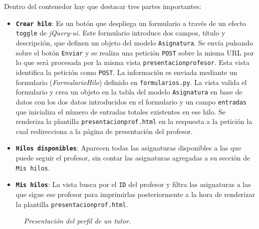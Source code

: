 \documentclass[a4paper, 12pt]{book}
\begin{document}
Dentro del contenedor hay que destacar tres partes importantes:
\begin{itemize}
  \item {\bfseries \texttt{Crear hilo}}: Es un bot\'on que despliega un formulario a trav\'es de un efecto \texttt{toggle} de \textit{jQuery-ui}. Este 
  formulario introduce dos campos, t\'itulo y descripci\'on, que definen un objeto del modelo \texttt{Asignatura}. Se env\'ia pulsando sobre el bot\'on
  \texttt{Enviar} y se realiza una petici\'on \texttt{POST} sobre la misma URL por lo que ser\'a procesada por la misma vista \texttt{presentacionprofesor}.
  Esta vista identifica la petici\'on como \texttt{POST}. La informaci\'on es enviada mediante un formulario (\textit{FormularioHilo}) definido en 
  \texttt{formularios.py}. La vista valida el formulario y crea un objeto en la tabla del modelo \texttt{Asignatura} en base de datos con los dos datos 
  introducidos en el formulario y un campo \texttt{entradas} que inicializa el n\'umero de entradas totales existentes en ese hilo. Se renderiza 
  la plantilla \texttt{presentacionprof.html} en la respuesta a la petici\'on la cual redirecciona a la p\'agina de presentaci\'on del profesor. 
  \item {\bfseries \texttt{Hilos disponibles}}: Aparecen todas las asignaturas disponibles a las que puede seguir el profesor, sin contar las asignaturas
  agregadas a su secci\'on de \texttt{Mis hilos}.
  \item {\bfseries \texttt{Mis hilos}}: La vista busca por el \texttt{ID} del profesor y filtra las asignaturas a las que sigue ese profesor para 
  imprimirlas posteriormente a la hora de renderizar la plantilla \texttt{presentacionprof.html}.
\end{itemize}

\begin{figure}
  \centering
  \caption{\textit{Presentaci\'on del perfil de un tutor.}}
  \label{fig:presentaciontutor}
\end{figure}
\end{document}
